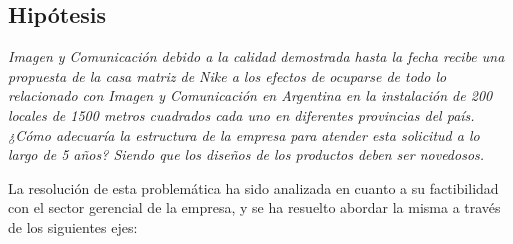 \documentclass[a4paper,10pt,titlepage]{article}
\begin{document}

\newpage
\subsection{Hipótesis}
\vspace{0.9cm}
\indent \textit{Imagen y Comunicación debido a la calidad demostrada hasta la fecha recibe una propuesta de la casa matriz de Nike a los efectos de ocuparse de todo lo relacionado con Imagen y Comunicación en Argentina en la instalación de 200 locales de 1500 metros cuadrados cada uno en diferentes provincias del país. ¿Cómo adecuaría la estructura de la empresa para atender esta solicitud a lo largo de 5 años? Siendo que los diseños de los productos deben ser novedosos.}\\
\vspace{0.9cm}

\indent La resoluci\'on de esta problem\'atica ha sido analizada en cuanto a su factibilidad con el sector gerencial de la empresa, y se ha resuelto abordar la misma a trav\'es de los siguientes ejes:\\
\end{document}
